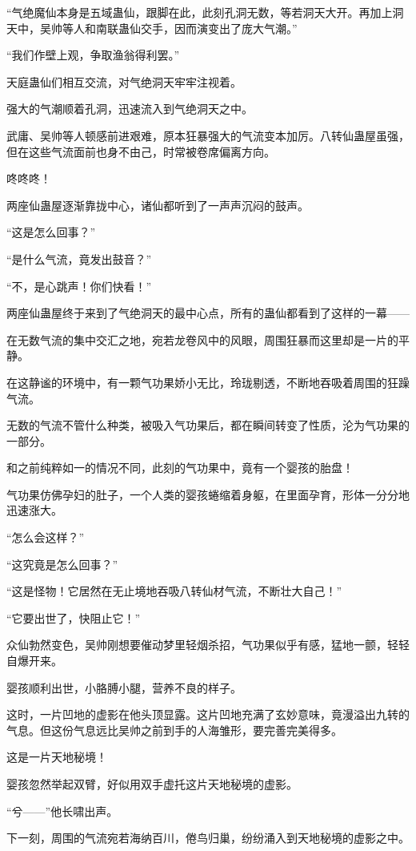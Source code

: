 \begin{this_body}
“气绝魔仙本身是五域蛊仙，跟脚在此，此刻孔洞无数，等若洞天大开。再加上洞天中，吴帅等人和南联蛊仙交手，因而演变出了庞大气潮。”

“我们作壁上观，争取渔翁得利罢。”

天庭蛊仙们相互交流，对气绝洞天牢牢注视着。

强大的气潮顺着孔洞，迅速流入到气绝洞天之中。

武庸、吴帅等人顿感前进艰难，原本狂暴强大的气流变本加厉。八转仙蛊屋虽强，但在这些气流面前也身不由己，时常被卷席偏离方向。

咚咚咚！

两座仙蛊屋逐渐靠拢中心，诸仙都听到了一声声沉闷的鼓声。

“这是怎么回事？”

“是什么气流，竟发出鼓音？”

“不，是心跳声！你们快看！”

两座仙蛊屋终于来到了气绝洞天的最中心点，所有的蛊仙都看到了这样的一幕——

在无数气流的集中交汇之地，宛若龙卷风中的风眼，周围狂暴而这里却是一片的平静。

在这静谧的环境中，有一颗气功果娇小无比，玲珑剔透，不断地吞吸着周围的狂躁气流。

无数的气流不管什么种类，被吸入气功果后，都在瞬间转变了性质，沦为气功果的一部分。

和之前纯粹如一的情况不同，此刻的气功果中，竟有一个婴孩的胎盘！

气功果仿佛孕妇的肚子，一个人类的婴孩蜷缩着身躯，在里面孕育，形体一分分地迅速涨大。

“怎么会这样？”

“这究竟是怎么回事？”

“这是怪物！它居然在无止境地吞吸八转仙材气流，不断壮大自己！”

“它要出世了，快阻止它！”

众仙勃然变色，吴帅刚想要催动梦里轻烟杀招，气功果似乎有感，猛地一颤，轻轻自爆开来。

婴孩顺利出世，小胳膊小腿，营养不良的样子。

这时，一片凹地的虚影在他头顶显露。这片凹地充满了玄妙意味，竟漫溢出九转的气息。但这份气息远比吴帅之前到手的人海雏形，要完善完美得多。

这是一片天地秘境！

婴孩忽然举起双臂，好似用双手虚托这片天地秘境的虚影。

“兮——”他长啸出声。

下一刻，周围的气流宛若海纳百川，倦鸟归巢，纷纷涌入到天地秘境的虚影之中。


\end{this_body}
